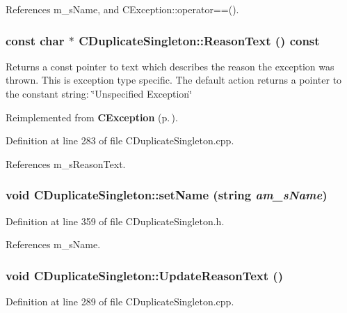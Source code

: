 References m\_\-s\-Name, and CException::operator==().
\subsubsection{\setlength{\rightskip}{0pt plus 5cm}const char $\ast$ CDuplicate\-Singleton::Reason\-Text () const\hspace{0.3cm}{\tt  [virtual]}}\label{classCDuplicateSingleton_a10}


Returns a const pointer to text which describes the reason the exception was thrown. This is exception type specific. The default action returns a pointer to the constant string: \char`\"{}Unspecified Exception\char`\"{} 

Reimplemented from {\bf CException} {\rm (p.\,\pageref{classCException_a8})}.

Definition at line 283 of file CDuplicate\-Singleton.cpp.

References m\_\-s\-Reason\-Text.
\subsubsection{\setlength{\rightskip}{0pt plus 5cm}void CDuplicate\-Singleton::set\-Name (string {\em am\_\-s\-Name})\hspace{0.3cm}{\tt  [inline]}}\label{classCDuplicateSingleton_a9}




Definition at line 359 of file CDuplicate\-Singleton.h.

References m\_\-s\-Name.
\subsubsection{\setlength{\rightskip}{0pt plus 5cm}void CDuplicate\-Singleton::Update\-Reason\-Text ()\hspace{0.3cm}{\tt  [protected]}}\label{classCDuplicateSingleton_b0}




Definition at line 289 of file CDuplicate\-Singleton.cpp.

